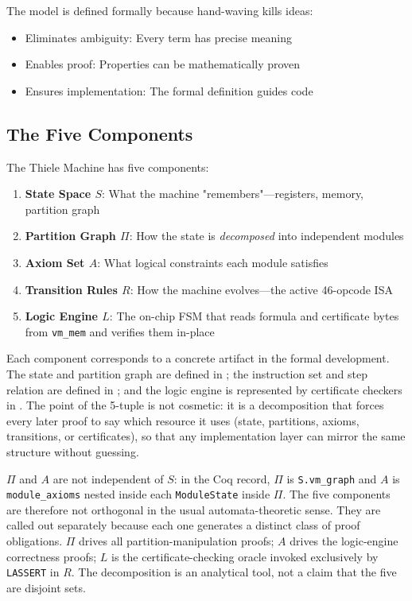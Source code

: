 The model is defined formally because hand-waving kills ideas:
\begin{itemize}
    \item Eliminates ambiguity: Every term has precise meaning
    \item Enables proof: Properties can be mathematically proven
    \item Ensures implementation: The formal definition guides code
\end{itemize}

\subsection{The Five Components}

The Thiele Machine has five components:
\begin{enumerate}
    \item \textbf{State Space $S$}: What the machine "remembers"---registers, memory, partition graph
    \item \textbf{Partition Graph $\Pi$}: How the state is \textit{decomposed} into independent modules
    \item \textbf{Axiom Set $A$}: What logical constraints each module satisfies
    \item \textbf{Transition Rules $R$}: How the machine evolves---the active 46-opcode ISA
    \item \textbf{Logic Engine $L$}: The on-chip FSM that reads formula and certificate bytes from \texttt{vm\_mem} and verifies them in-place
\end{enumerate}
Each component corresponds to a concrete artifact in the formal development. The state and partition graph are defined in ; the instruction set and step relation are defined in ; and the logic engine is represented by certificate checkers in . The point of the 5-tuple is not cosmetic: it is a decomposition that forces every later proof to say which resource it uses (state, partitions, axioms, transitions, or certificates), so that any implementation layer can mirror the same structure without guessing.

\begin{tcolorbox}[colback=blue!5!white,colframe=blue!40!black,title=\textbf{A note on tuple structure}]
$\Pi$ and $A$ are not independent of $S$: in the Coq record, $\Pi$ is \texttt{S.vm\_graph} and $A$ is \texttt{module\_axioms} nested inside each \texttt{ModuleState} inside $\Pi$. The five components are therefore not orthogonal in the usual automata-theoretic sense. They are called out separately because each one generates a distinct class of proof obligations. $\Pi$ drives all partition-manipulation proofs; $A$ drives the logic-engine correctness proofs; $L$ is the certificate-checking oracle invoked exclusively by \texttt{LASSERT} in $R$. The decomposition is an analytical tool, not a claim that the five are disjoint sets.
\end{tcolorbox}


